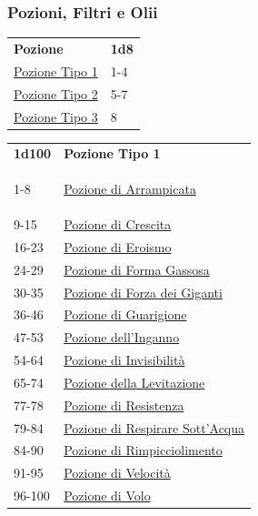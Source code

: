 \begin{multicols}{2}
{\subsubsection{Pozioni, Filtri e Olii}\hypertarget{pozionifiltri}{}\label{pozionifiltri}

{\small\begin{tabular}{ll}
\textbf{Pozione}&\textbf{1d8}\\
\hyperlink{pozionifiltri}{Pozione Tipo 1} &1-4\\
\hyperlink{pozionifiltri}{Pozione Tipo 2} &5-7\\
\hyperlink{pozionifiltri}{Pozione Tipo 3} &8
\end{tabular}}

\medskip

{\small\begin{tabular}{ll}
\textbf{1d100} & \textbf{Pozione Tipo 1}\\\hypertarget{Pozione Tipo 1}{}
1-8 & \hyperlink{PozionediArrampicata}{Pozione di Arrampicata}\\
9-15 & \hyperlink{PozionediCrescita}{Pozione di Crescita}\\
16-23 & \hyperlink{PozionediEroismo}{Pozione di Eroismo}\\
24-29 & \hyperlink{PozionediFormaGassosa}{Pozione di Forma Gassosa}\\
30-35 & \hyperlink{PozionediForzadeiGiganti}{Pozione di Forza dei Giganti}\\
36-46 & \hyperlink{PozionediGuarigione}{Pozione di Guarigione}\\
47-53 & \hyperlink{Pozionedell'Inganno}{Pozione dell'Inganno}\\
54-64 & \hyperlink{PozionediInvisibilità}{Pozione di Invisibilità}\\
65-74 & \hyperlink{PozionedellaLevitazione}{Pozione della Levitazione}\\
77-78 & \hyperlink{PozionediResistenza}{Pozione di Resistenza}\\
79-84 & \hyperlink{PozionediRespirareSott'Acqua}{Pozione di Respirare Sott'Acqua}\\
84-90 & \hyperlink{PozionediRimpicciolimento}{Pozione di Rimpicciolimento}\\
91-95 & \hyperlink{PozionediVelocità}{Pozione di Velocità}\\
96-100 & \hyperlink{PozionediVolo}{Pozione di Volo}
\end{tabular}}

}
\end{multicols}

